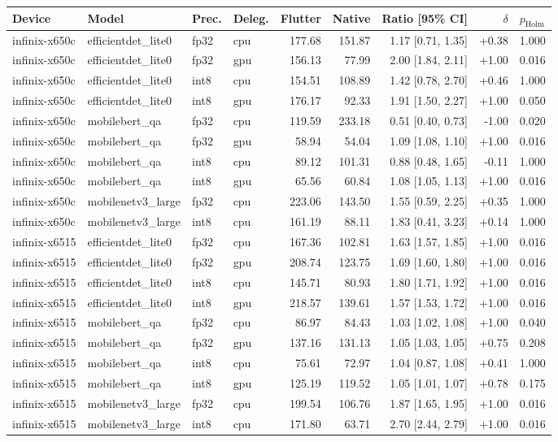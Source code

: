 \begin{tabular}{llllrrrrl}
\toprule
Device & Model & Prec. & Deleg. & Flutter & Native & Ratio [95\% CI] & $\delta$ & $p_{\mathrm{Holm}}$ \\
\midrule
infinix-x650c & efficientdet\_lite0 & fp32 & cpu & 177.68 & 151.87 & 1.17 [0.71, 1.35] & +0.38 & 1.000 \\
infinix-x650c & efficientdet\_lite0 & fp32 & gpu & 156.13 & 77.99 & 2.00 [1.84, 2.11] & +1.00 & 0.016 \\
infinix-x650c & efficientdet\_lite0 & int8 & cpu & 154.51 & 108.89 & 1.42 [0.78, 2.70] & +0.46 & 1.000 \\
infinix-x650c & efficientdet\_lite0 & int8 & gpu & 176.17 & 92.33 & 1.91 [1.50, 2.27] & +1.00 & 0.050 \\
infinix-x650c & mobilebert\_qa & fp32 & cpu & 119.59 & 233.18 & 0.51 [0.40, 0.73] & -1.00 & 0.020 \\
infinix-x650c & mobilebert\_qa & fp32 & gpu & 58.94 & 54.04 & 1.09 [1.08, 1.10] & +1.00 & 0.016 \\
infinix-x650c & mobilebert\_qa & int8 & cpu & 89.12 & 101.31 & 0.88 [0.48, 1.65] & -0.11 & 1.000 \\
infinix-x650c & mobilebert\_qa & int8 & gpu & 65.56 & 60.84 & 1.08 [1.05, 1.13] & +1.00 & 0.016 \\
infinix-x650c & mobilenetv3\_large & fp32 & cpu & 223.06 & 143.50 & 1.55 [0.59, 2.25] & +0.35 & 1.000 \\
infinix-x650c & mobilenetv3\_large & int8 & cpu & 161.19 & 88.11 & 1.83 [0.41, 3.23] & +0.14 & 1.000 \\
infinix-x6515 & efficientdet\_lite0 & fp32 & cpu & 167.36 & 102.81 & 1.63 [1.57, 1.85] & +1.00 & 0.016 \\
infinix-x6515 & efficientdet\_lite0 & fp32 & gpu & 208.74 & 123.75 & 1.69 [1.60, 1.80] & +1.00 & 0.016 \\
infinix-x6515 & efficientdet\_lite0 & int8 & cpu & 145.71 & 80.93 & 1.80 [1.71, 1.92] & +1.00 & 0.016 \\
infinix-x6515 & efficientdet\_lite0 & int8 & gpu & 218.57 & 139.61 & 1.57 [1.53, 1.72] & +1.00 & 0.016 \\
infinix-x6515 & mobilebert\_qa & fp32 & cpu & 86.97 & 84.43 & 1.03 [1.02, 1.08] & +1.00 & 0.040 \\
infinix-x6515 & mobilebert\_qa & fp32 & gpu & 137.16 & 131.13 & 1.05 [1.03, 1.05] & +0.75 & 0.208 \\
infinix-x6515 & mobilebert\_qa & int8 & cpu & 75.61 & 72.97 & 1.04 [0.87, 1.08] & +0.41 & 1.000 \\
infinix-x6515 & mobilebert\_qa & int8 & gpu & 125.19 & 119.52 & 1.05 [1.01, 1.07] & +0.78 & 0.175 \\
infinix-x6515 & mobilenetv3\_large & fp32 & cpu & 199.54 & 106.76 & 1.87 [1.65, 1.95] & +1.00 & 0.016 \\
infinix-x6515 & mobilenetv3\_large & int8 & cpu & 171.80 & 63.71 & 2.70 [2.44, 2.79] & +1.00 & 0.016 \\
\bottomrule
\end{tabular}
